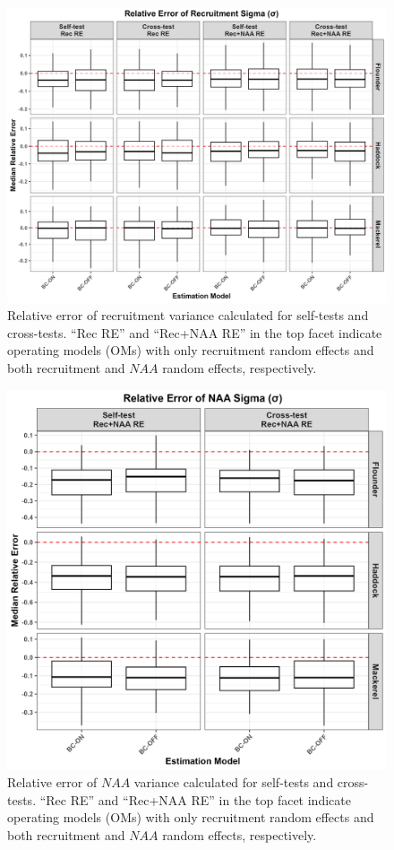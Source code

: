 \documentclass[
  12pt,
]{article}
\begin{document}
\begin{figure}[H]
\centering
\includegraphics[width=\textwidth]{Revised_Figures&Tables/Rec_sigma.PNG}
\caption{Relative error of recruitment variance calculated for self-tests and cross-tests. ``Rec RE'' and ``Rec+NAA RE'' in the top facet indicate operating models (OMs) with only recruitment random effects and both recruitment and $NAA$ random effects, respectively.}
\label{fig:Rec_sigma}
\end{figure}

\begin{figure}[H]
\centering
\includegraphics[width=\textwidth]{Revised_Figures&Tables/NAA_sigma.PNG}
\caption{Relative error of $NAA$ variance calculated for self-tests and cross-tests. ``Rec RE'' and ``Rec+NAA RE'' in the top facet indicate operating models (OMs) with only recruitment random effects and both recruitment and $NAA$ random effects, respectively.}
\label{fig:NAA_sigma}
\end{figure}
\end{document}
